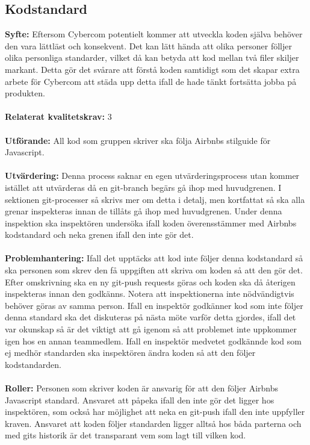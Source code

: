 \documentclass[10pt]{article}
\begin{document}
	\subsection{Kodstandard}
	\textbf{Syfte:}	Eftersom Cybercom potentielt kommer att utveckla koden själva behöver den vara lättläst och konsekvent. Det kan lätt hända att olika personer fölljer olika personliga standarder, vilket då kan betyda att kod mellan två filer skiljer markant. Detta gör det svårare att förstå koden samtidigt som det skapar extra arbete för Cybercom att städa upp detta ifall de hade tänkt fortsätta jobba på produkten.
	\\\\
	\textbf{Relaterat kvalitetskrav:} 3
	\\\\
	\textbf{Utförande:} All kod som gruppen skriver ska följa Airbnbs stilguide för Javascript\cite{bib-airbnb}.
	\\\\
	\textbf{Utvärdering:} Denna process saknar en egen utvärderingsprocess utan kommer istället att utvärderas då en git-branch begärs gå ihop med huvudgrenen. I sektionen git-processer så skrivs mer om detta i detalj, men kortfattat så ska alla grenar inspekteras innan de tillåts gå ihop med huvudgrenen. Under denna inspektion ska inspektören undersöka ifall koden överensstämmer med Airbnbs kodstandard och neka grenen ifall den inte gör det.
	\\\\
	\textbf{Problemhantering:} Ifall det upptäcks att kod inte följer denna kodstandard så ska personen som skrev den få uppgiften att skriva om koden så att den gör det. Efter omskrivning ska en ny git-push requests göras och koden ska då återigen inspekteras innan den godkänns. Notera att inspektionerna inte nödvändigtvis behöver göras av samma person.
	Ifall en inspektör godkänner kod som inte följer denna standard ska det diskuteras på nästa möte varför detta gjordes, ifall det var okunskap så är det viktigt att gå igenom så att problemet inte uppkommer igen hos en annan teammedlem. Ifall en inspektör medvetet godkännde kod som ej medhör standarden ska inspektören ändra koden så att den följer kodstandarden.
	\\\\
	\textbf{Roller:} Personen som skriver koden är ansvarig för att den följer Airbnbs Javascript standard. Ansvaret att påpeka ifall den inte gör det ligger hos inspektören, som också har möjlighet att neka en git-push ifall den inte uppfyller kraven. Ansvaret att koden följer standarden ligger alltså hos båda parterna och med gits historik är det transparant vem som lagt till vilken kod.
	
\end{document}
